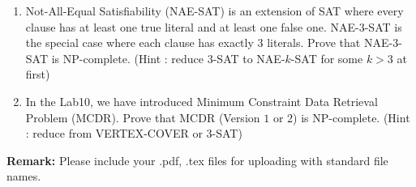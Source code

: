 \documentclass[12pt,a4paper]{article}
\theoremstyle{definition}
\begin{document}
\begin{enumerate}
	\item Not-All-Equal Satisfiability (NAE-SAT) is an extension of SAT where every clause has at least one true literal and at least one false one. NAE-$3$-SAT is the special case where each clause has exactly $3$ literals. Prove that NAE-$3$-SAT is NP-complete. (Hint : reduce $3$-SAT to NAE-$k$-SAT for some $k > 3$ at first)

	\item In the Lab10, we have introduced Minimum Constraint Data Retrieval Problem (MCDR). Prove that MCDR (Version $1$ or $2$) is NP-complete. (Hint : reduce from VERTEX-COVER or $3$-SAT)

\end{enumerate}

\textbf{Remark:} Please include your .pdf, .tex files for uploading with standard file names.




\end{document}
